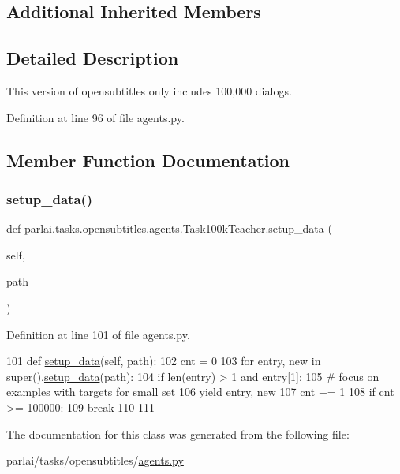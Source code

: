\subsection*{Additional Inherited Members}


\subsection{Detailed Description}
\begin{DoxyVerb}This version of opensubtitles only includes 100,000 dialogs.
\end{DoxyVerb}
 

Definition at line 96 of file agents.\+py.



\subsection{Member Function Documentation}
\mbox{\label{classparlai_1_1tasks_1_1opensubtitles_1_1agents_1_1Task100kTeacher_ac1bceba11d526547b201f29a15427deb}} 
\subsubsection{\texorpdfstring{setup\+\_\+data()}{setup\_data()}}
{\footnotesize\ttfamily def parlai.\+tasks.\+opensubtitles.\+agents.\+Task100k\+Teacher.\+setup\+\_\+data (\begin{DoxyParamCaption}\item[{}]{self,  }\item[{}]{path }\end{DoxyParamCaption})}



Definition at line 101 of file agents.\+py.


\begin{DoxyCode}
101     \textcolor{keyword}{def }\hyperlink{namespaceparlai_1_1tasks_1_1multinli_1_1agents_a4fa2cb0ba1ed745336ad8bceed36b841}{setup\_data}(self, path):
102         cnt = 0
103         \textcolor{keywordflow}{for} entry, new \textcolor{keywordflow}{in} super().\hyperlink{namespaceparlai_1_1tasks_1_1multinli_1_1agents_a4fa2cb0ba1ed745336ad8bceed36b841}{setup\_data}(path):
104             \textcolor{keywordflow}{if} len(entry) > 1 \textcolor{keywordflow}{and} entry[1]:
105                 \textcolor{comment}{# focus on examples with targets for small set}
106                 \textcolor{keywordflow}{yield} entry, new
107             cnt += 1
108             \textcolor{keywordflow}{if} cnt >= 100000:
109                 \textcolor{keywordflow}{break}
110 
111 
\end{DoxyCode}


The documentation for this class was generated from the following file\+:\begin{DoxyCompactItemize}
\item 
parlai/tasks/opensubtitles/\hyperlink{parlai_2tasks_2opensubtitles_2agents_8py}{agents.\+py}\end{DoxyCompactItemize}
